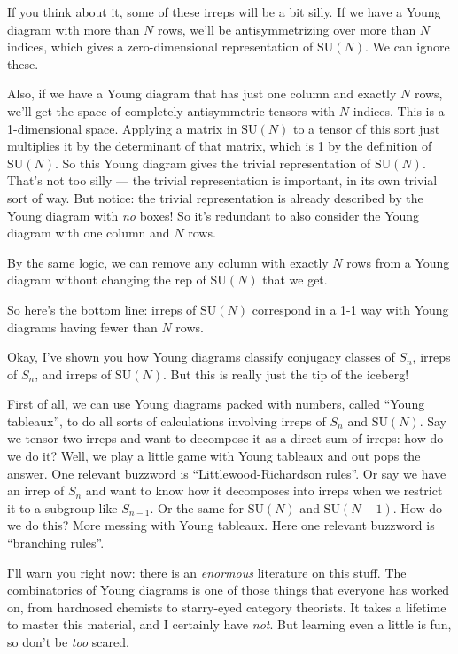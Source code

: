 \documentclass{article}
\begin{document}
If you think about it, some of these irreps will be a bit silly. If we
have a Young diagram with more than \(N\) rows, we'll be
antisymmetrizing over more than \(N\) indices, which gives a
zero-dimensional representation of \(\mathrm{SU}(N)\). We can ignore
these.

Also, if we have a Young diagram that has just one column and exactly
\(N\) rows, we'll get the space of completely antisymmetric tensors with
\(N\) indices. This is a 1-dimensional space. Applying a matrix in
\(\mathrm{SU}(N)\) to a tensor of this sort just multiplies it by the
determinant of that matrix, which is 1 by the definition of
\(\mathrm{SU}(N)\). So this Young diagram gives the trivial
representation of \(\mathrm{SU}(N)\). That's not too silly --- the
trivial representation is important, in its own trivial sort of way. But
notice: the trivial representation is already described by the Young
diagram with \emph{no} boxes! So it's redundant to also consider the
Young diagram with one column and \(N\) rows.

By the same logic, we can remove any column with exactly \(N\) rows from
a Young diagram without changing the rep of \(\mathrm{SU}(N)\) that we
get.

So here's the bottom line: irreps of \(\mathrm{SU}(N)\) correspond in a
1-1 way with Young diagrams having fewer than \(N\) rows.

Okay, I've shown you how Young diagrams classify conjugacy classes of
\(S_n\), irreps of \(S_n\), and irreps of \(\mathrm{SU}(N)\). But this
is really just the tip of the iceberg!

First of all, we can use Young diagrams packed with numbers, called
``Young tableaux'', to do all sorts of calculations involving irreps of
\(S_n\) and \(\mathrm{SU}(N)\). Say we tensor two irreps and want to
decompose it as a direct sum of irreps: how do we do it? Well, we play a
little game with Young tableaux and out pops the answer. One relevant
buzzword is ``Littlewood-Richardson rules''. Or say we have an irrep of
\(S_n\) and want to know how it decomposes into irreps when we restrict
it to a subgroup like \(S_{n-1}\). Or the same for \(\mathrm{SU}(N)\)
and \(\mathrm{SU}(N-1)\). How do we do this? More messing with Young
tableaux. Here one relevant buzzword is ``branching rules''.

I'll warn you right now: there is an \emph{enormous} literature on this
stuff. The combinatorics of Young diagrams is one of those things that
everyone has worked on, from hardnosed chemists to starry-eyed category
theorists. It takes a lifetime to master this material, and I certainly
have \emph{not}. But learning even a little is fun, so don't be
\emph{too} scared.
\end{document}
